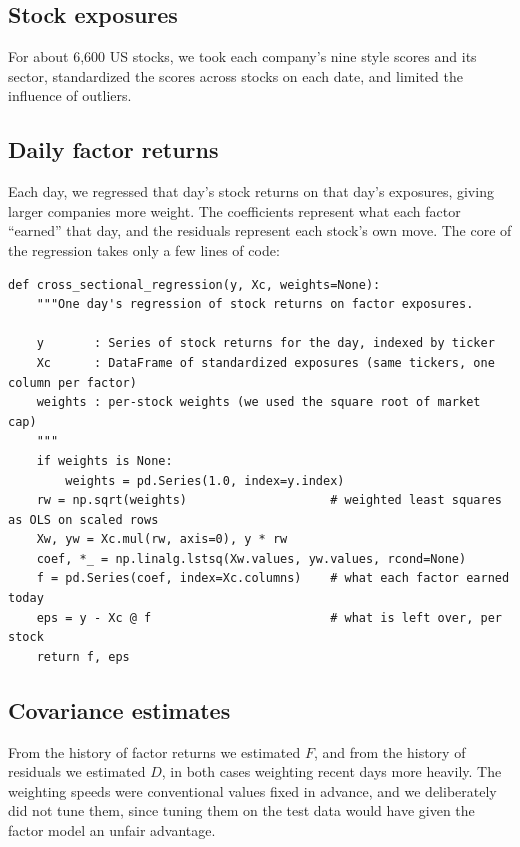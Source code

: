 \documentclass[11pt,letterpaper]{article}
\begin{document}
\subsection{Stock exposures}

For about 6,600 US stocks, we took each company's nine style scores and its sector,
standardized the scores across stocks on each date, and limited the influence of outliers.

\subsection{Daily factor returns}

Each day, we regressed that day's stock returns on that day's exposures, giving larger
companies more weight. The coefficients represent what each factor ``earned'' that day, and
the residuals represent each stock's own move. The core of the regression takes only a few
lines of code:

\begin{lstlisting}
def cross_sectional_regression(y, Xc, weights=None):
    """One day's regression of stock returns on factor exposures.

    y       : Series of stock returns for the day, indexed by ticker
    Xc      : DataFrame of standardized exposures (same tickers, one column per factor)
    weights : per-stock weights (we used the square root of market cap)
    """
    if weights is None:
        weights = pd.Series(1.0, index=y.index)
    rw = np.sqrt(weights)                    # weighted least squares as OLS on scaled rows
    Xw, yw = Xc.mul(rw, axis=0), y * rw
    coef, *_ = np.linalg.lstsq(Xw.values, yw.values, rcond=None)
    f = pd.Series(coef, index=Xc.columns)    # what each factor earned today
    eps = y - Xc @ f                         # what is left over, per stock
    return f, eps
\end{lstlisting}

\subsection{Covariance estimates}

From the history of factor returns we estimated $F$, and from the history of residuals we
estimated $D$, in both cases weighting recent days more heavily. The weighting speeds were
conventional values fixed in advance, and we deliberately did not tune them, since tuning
them on the test data would have given the factor model an unfair advantage.
\end{document}
